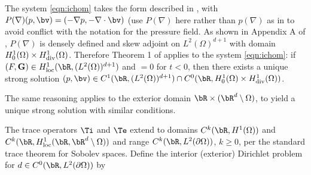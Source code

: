 The system \ref{eqn:ichom} takes the form described in
\cite{BlazekStolkSymes:13}, with $P(\nabla) (p,\bv) = (-\nabla p,
-\nabla \cdot \bv)$ (use $P(\nabla)$ here rather than $p(\nabla)$ as
in \cite{BlazekStolkSymes:13} to avoid conflict with the notation for
the pressure field. As shown in Appendix A of
\cite{BlazekStolkSymes:13}, $P(\nabla)$ is densely defined and skew adjoint  on $L^2(\Omega)^{d+1}$ with domain
$H^1_0(\Omega) \times H^1_{\rm div}(\Omega)$. Therefore
Theorem 1 of  \cite{BlazekStolkSymes:13} applies to the system
\ref{eqn:ichom}: if $(F, {\bf G}) \in H^1_{\rm loc}(\bR,(L^2(\Omega))^{d+1})$
and $= 0$ for $t<0$, then there exists a unique strong solution
$(p,\bv) \in C^1(\bR,(L^2(\Omega))^{d+1}) \cap C^0(\bR,  H^1_0(\Omega) 
\times H^1_{\rm div}(\Omega))$.

The same reasoning applies to the exterior domain $\bR \times (\bR^d
\setminus \Omega)$, to yield a unique strong solution with similar conditions.

The trace operators $\Ti$ and $\Te$ extend to domains $C^k(\bR,
H^1(\Omega))$ and $C^k(\bR,H^1_{\rm loc}(\bR,\bR^d \setminus
\Omega))$
and range $C^k(\bR,L^2(\partial \Omega))$, $k \ge 0$, per the standard trace
theorem for Sobolev spaces. Define the interior (exterior) Dirichlet
problem for $d \in C^0(\bR,L^2(\partial \Omega))$ by
 
